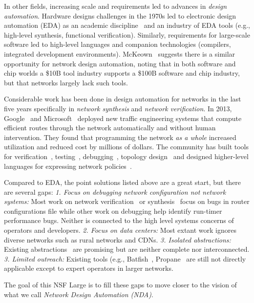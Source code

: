 In other fields, increasing scale and requirements led to advances in \emph{design automation}. Hardware designs challenges in the 1970s led to electronic design automation (EDA) as an academic discipline~\cite{alberto} and an industry of EDA tools (e.g., high-level synthesis, functional verification). Similarly, requirements for large-scale software led to high-level languages and companion technologies (compilers, integrated development environments).   McKeown~\cite{mckeown} suggests there is a similar opportunity for network design automation, noting that in both software and chip worlds a \$10B tool industry supports a \$100B software and chip industry, but that networks largely lack such tools.

Considerable work has been done in design automation for networks in the last five years specifically in {\em network synthesis} and \emph{network verification}.  In 2013, Google~\cite{b4} and Microsoft~\cite{swan} deployed new traffic engineering systems that compute efficient routes through the network automatically and without human intervention. They found that programming the network {\em as a whole} increased utilization and reduced cost by millions of dollars. The community has built tools for verification~\cite{veriflow,hsa,lam}, testing~\cite{atpg,nice}, debugging~\cite{xtrace,marple}, topology design~\cite{condor} and designed higher-level languages for expressing network policies~\cite{netkat,propane}.

Compared to EDA, the point solutions listed above are a great start, but there are several gaps: {\em 1. Focus on debugging network configuration not network systems:}  Most work on
network verification~\cite{hsa,veriflow,minesweeper} or synthesis~\cite{netkat,propane} focus
on bugs in router configurations file while other work on debugging \cite{bsd,pathqueries,marple} help identify run-timer performance bugs.  Neither is
connected to the high level systems concerns of operators and developers.
{\em 2. Focus on data centers:} Most extant work ignores diverse networks such
as rural networks and CDNs. {\em 3. Isolated abstractions:} Existing
abstractions~\cite{netkat,propane,hsa,Ethane,4DControlPlane} are promising but are neither
complete nor interconnected.  {\em 3. Limited outreach:} Existing tools (e.g., Batfish~\cite{batfish}, Propane~\cite{propane} are still not directly
applicable except to expert operators in larger networks.

The goal of this NSF Large is to fill these gaps to move closer to the vision of what we call \emph{Network Design Automation (NDA)}.

